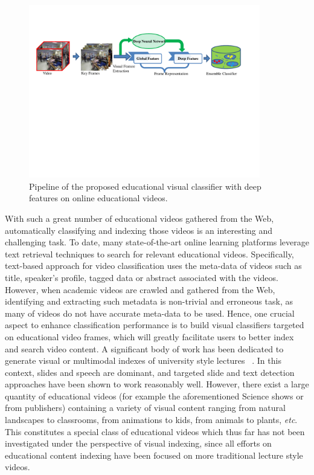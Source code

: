 \documentclass[11pt,twocolumn,twoside]{IEEEtran}
\begin{document}
\begin{figure}[t]
\centering
\includegraphics[width=0.9\textwidth]{fig2.pdf}
\caption{Pipeline of the proposed educational visual classifier with deep features on online educational videos. } \label{fig:fig2}
\end{figure}


With such a great number of educational videos gathered from the Web, automatically classifying and indexing those videos is an interesting and challenging task.
To date, many state-of-the-art online learning platforms leverage
text retrieval techniques to search for relevant educational videos. Specifically, text-based approach for video classification uses the meta-data of videos such as title, speaker's profile, tagged data or abstract associated with the videos. However, when academic videos are crawled and gathered from the Web, identifying and extracting such metadata is non-trivial and erroneous task, as many of videos do not have accurate meta-data to be used.
Hence, one crucial aspect to enhance classification performance is to build visual classifiers targeted on educational video frames, which will greatly facilitate users to better index and search video content. A significant body of work has been dedicated to generate visual or multimodal indexes of university style lectures ~\cite{VastMM}\cite{talkminer}. In this context, slides and speech are dominant, and targeted slide and text detection approaches have been shown to work reasonably well. However, there exist a large quantity of educational videos (for example the aforementioned Science shows or from publishers) containing a variety of visual content ranging from natural landscapes to classrooms, from animations to kids, from animals to plants, \emph{etc}. This constitutes a special class of educational videos which thus far has not been investigated under the perspective of visual indexing, since all efforts on educational content indexing have been focused on more traditional lecture style videos.
\end{document}

